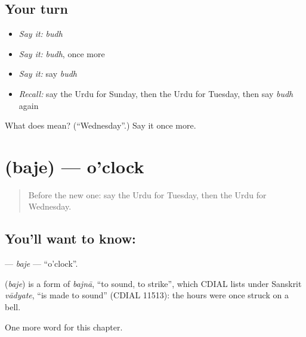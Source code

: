 \subsection*{Your turn}
\begin{itemize}
\raggedright
  \item \emph{Say it:} \emph{budh}
  \item \emph{Say it:} \emph{budh}, once more
  \item \emph{Say it:} say \emph{budh}
  \item \emph{Recall:} say the Urdu for Sunday, then the Urdu for Tuesday, then say \emph{budh} again
\end{itemize}

\begin{tcolorbox}[breakable,colback=teal!4,colframe=teal!35!black,title={Before you move on}]
What does  mean? (\textquotedblleft{}Wednesday\textquotedblright{}.) Say it once more.
\end{tcolorbox}
\section[\texorpdfstring{\ur{بجے} (baje)}{بجے (baje)}]{ (baje) — o'clock}

\label{lesson:UR-C92-baje}



\begin{quote}
Before the new one: say the Urdu for Tuesday, then the Urdu for Wednesday.
\end{quote}

\subsection*{You'll want to know: }
\textbf{} — \emph{baje} — \textquotedblleft{}o'clock\textquotedblright{}.

\begin{cousinweb}
\textbf{} (\emph{baje}) is a form of \emph{bajnā}, \textquotedblleft{}to sound, to strike\textquotedblright{}, which CDIAL lists under Sanskrit \emph{vādyate}, \textquotedblleft{}is made to sound\textquotedblright{} (CDIAL 11513): the hours were once struck on a bell.
\end{cousinweb}

\begin{grammarlens}[title={What you've built}]
One more word for this chapter.
\end{grammarlens}

